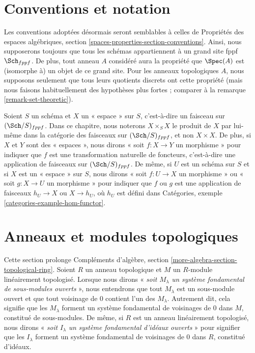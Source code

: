 \section{Conventions et notation}
\label{section-conventions}

\noindent
Les conventions adoptées désormais seront semblables à celles de
Propriétés des espaces algébriques, section \ref{spaces-properties-section-conventions}.
Ainsi, nous supposerons toujours que tous les schémas appartiennent
à un grand site fppf $\Sch_{fppf}$. De plus, tout anneau $A$ considéré aura la
propriété que $\Spec(A)$ est (isomorphe à) un objet de ce grand site.
Pour les anneaux topologiques $A$, nous supposons seulement que tous leurs quotients discrets ont
cette propriété (mais nous faisons habituellement des hypothèses plus fortes ; comparer à la
remarque \ref{remark-set-theoretic}).

\medskip\noindent
Soient $S$ un schéma et $X$ un « espace » sur $S$, c'est-à-dire un faisceau sur
$(\Sch/S)_{fppf}$. Dans ce chapitre, nous noterons $X \times_S X$ le
produit de $X$ par lui-même dans la catégorie des faisceaux sur $(\Sch/S)_{fppf}$,
et non $X \times X$. De plus, si $X$ et $Y$ sont des « espaces »,
nous dirons « soit $f : X \to Y$ un morphisme » pour indiquer que $f$ est une
transformation naturelle de foncteurs, c'est-à-dire une application de faisceaux sur
$(\Sch/S)_{fppf}$. De même, si $U$ est un schéma sur $S$ et si
$X$ est un « espace » sur $S$, nous dirons
« soit $f : U \to X$ un morphisme » ou
« soit $g : X \to U$ un morphisme » pour indiquer que $f$ ou $g$
est une application de faisceaux $h_U \to X$ ou $X \to h_U$, où $h_U$ est défini dans
Catégories, exemple \ref{categories-example-hom-functor}.






\section{Anneaux et modules topologiques}
\label{section-topological-module}

\noindent
Cette section prolonge
Compléments d'algèbre, section \ref{more-algebra-section-topological-ring}.
Soient $R$ un anneau topologique et $M$ un $R$-module linéairement topologisé.
Lorsque nous dirons « {\it soit $M_\lambda$ un système fondamental de
sous-modules ouverts} », nous entendrons que tout $M_\lambda$ est un sous-module ouvert
et que tout voisinage de $0$ contient l'un des $M_\lambda$.
Autrement dit, cela signifie que les $M_\lambda$ forment un système fondamental
de voisinages de $0$ dans $M$, constitué de sous-modules.
De même, si $R$ est un anneau linéairement topologisé, nous dirons
« {\it soit $I_\lambda$ un système fondamental d'idéaux ouverts} »
pour signifier que les $I_\lambda$ forment un système fondamental
de voisinages de $0$ dans $R$, constitué d'idéaux.

